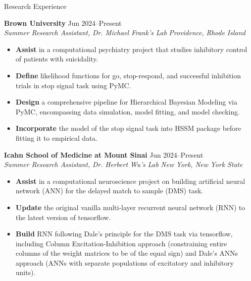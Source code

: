 \documentclass{resume} %
\begin{document}
\begin{rSection}{Research Experience}

\textbf{Brown University} \hfill{Jun 2024--Present} \\
\textit{Summer Research Assistant, Dr. Michael Frank’s Lab} \hfill{\textit{Providence, Rhode Island}}
 \begin{itemize}
    \itemsep -5pt {} 
     \item \textbf{Assist} in a computational psychiatry project that studies inhibitory control of patients with suicidality.
     \item \textbf{Define} likelihood functions for go, stop-respond, and successful inhibition trials in stop signal task using PyMC.
     \item \textbf{Design} a comprehensive pipeline for Hierarchical Bayesian Modeling via PyMC, encompassing data simulation, model fitting, and model checking. 
     \item \textbf{Incorporate} the model of the stop signal task into HSSM package before fitting it to empirical data.
 \end{itemize}

\textbf{Icahn School of Medicine at Mount Sinai} \hfill{Jun 2024--Present} \\
\textit{Summer Research Assistant, Dr. Herbert Wu’s Lab} \hfill{\textit{New York, New York State}}
 \begin{itemize}
    \itemsep -5pt {} 
     \item \textbf{Assist} in a computational neuroscience project on building artificial neural network (ANN) for the delayed match to sample (DMS) task. 
     \item \textbf{Update} the original vanilla multi-layer recurrent neural network (RNN) to the latest version of tensorflow. 
     \item \textbf{Build} RNN following Dale's principle for the DMS task via tensorflow, including Column Excitation-Inhibition approach (constraining entire columns of the weight matrices to be of the equal sign) and Dale’s ANNs approach (ANNs with separate populations of excitatory and inhibitory units).
 \end{itemize}


\end{rSection}
\end{document}
